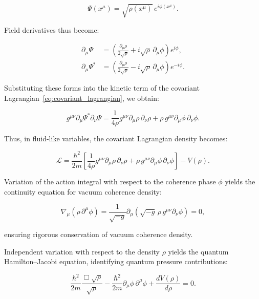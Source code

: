 \begin{equation}
\Psi(x^\mu) = \sqrt{\rho(x^\mu)}\,e^{i\phi(x^\mu)}.
\label{eq:madelung_transformation}
\end{equation}

Field derivatives thus become:

\begin{align}
\partial_\mu\Psi &= \left(\frac{\partial_\mu\rho}{2\sqrt{\rho}} + i\sqrt{\rho}\,\partial_\mu\phi\right)e^{i\phi},\label{eq:madelung_derivative}\\[6pt]
\partial_\mu\Psi^* &= \left(\frac{\partial_\mu\rho}{2\sqrt{\rho}} - i\sqrt{\rho}\,\partial_\mu\phi\right)e^{-i\phi}.
\label{eq:madelung_derivative_conj}
\end{align}

Substituting these forms into the kinetic term of the covariant Lagrangian~\eqref{eq:covariant_lagrangian}, we obtain:

\begin{equation}
g^{\mu\nu}\partial_\mu\Psi^*\partial_\nu\Psi = \frac{1}{4\rho}g^{\mu\nu}\partial_\mu\rho\,\partial_\nu\rho + \rho\,g^{\mu\nu}\partial_\mu\phi\,\partial_\nu\phi.
\label{eq:kinetic_expanded}
\end{equation}

Thus, in fluid-like variables, the covariant Lagrangian density becomes:

\begin{equation}
\mathcal{L} = \frac{\hbar^2}{2m}\left[\frac{1}{4\rho}g^{\mu\nu}\partial_\mu\rho\,\partial_\nu\rho + \rho\,g^{\mu\nu}\partial_\mu\phi\,\partial_\nu\phi\right]-V(\rho).
\label{eq:lagrangian_fluid}
\end{equation}

Variation of the action integral with respect to the coherence phase \(\phi\) yields the continuity equation for vacuum coherence density:

\begin{equation}
\nabla_\mu(\rho\,\partial^\mu\phi) = \frac{1}{\sqrt{-g}}\partial_\mu(\sqrt{-g}\,\rho\,g^{\mu\nu}\partial_\nu\phi) = 0,
\label{eq:continuity}
\end{equation}

ensuring rigorous conservation of vacuum coherence density.

Independent variation with respect to the density \(\rho\) yields the quantum Hamilton–Jacobi equation, identifying quantum pressure contributions:

\begin{equation}
\frac{\hbar^2}{2m}\frac{\Box\sqrt{\rho}}{\sqrt{\rho}} - \frac{\hbar^2}{2m}\partial_\mu\phi\,\partial^\mu\phi + \frac{dV(\rho)}{d\rho} = 0.
\label{eq:hamilton_jacobi_detailed}
\end{equation}

